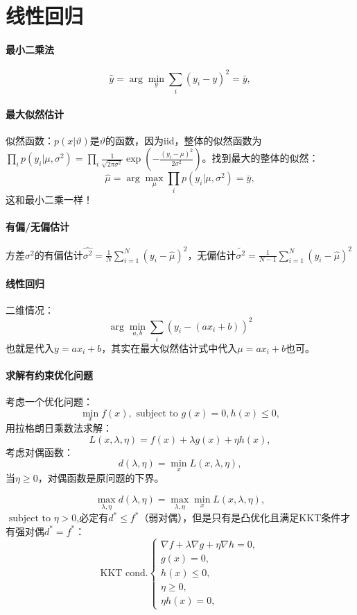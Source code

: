 \section{线性回归}

\paragraph{最小二乘法}
\begin{equation}
    \hat{y} = \arg \min_y \sum_i (y_i - y)^2 = \bar{y},
\end{equation}

\paragraph{最大似然估计} 似然函数：$p(x|\vartheta)$是$\vartheta$的函数，因为iid，整体的似然函数为$\prod_i p(y_i|\mu, \sigma^2) = \prod_i \frac{1}{\sqrt{2\pi\sigma^2}}\exp\left(-\frac{(y_i-\mu)^2}{2\sigma^2}\right)$。找到最大的整体的似然：
$$\hat{\mu} = \arg\max_\mu\prod_i p(y_i|\mu, \sigma^2) = \bar{y},$$这和最小二乘一样！

\paragraph{有偏/无偏估计} 方差$\sigma^2$的有偏估计$\hat{\sigma^2}=\frac{1}{N}\sum_{i=1}^N(y_i-\hat{\mu})^2$，无偏估计$\tilde{\sigma^2}=\frac{1}{N-1}\sum_{i=1}^N(y_i-\hat{\mu})^2$

\paragraph{线性回归}
二维情况：$$\arg\min_{a,b}\sum_i(y_i-(ax_i + b))^2$$
也就是代入$y=ax_i + b$，其实在最大似然估计式中代入$\mu=ax_i + b$也可。

\paragraph{求解有约束优化问题} 考虑一个优化问题：
$$\min_x f(x),\text{ subject to }g(x) = 0, h(x) \le 0,$$
用拉格朗日乘数法求解：
$$L(x,\lambda,\eta)=f(x)+\lambda g(x)+\eta h(x),$$
考虑对偶函数：
$$d(\lambda,\eta)=\min_xL(x,\lambda,\eta),$$
当$\eta \ge 0$，对偶函数是原问题的下界。

$$\max_{\lambda,\eta} d(\lambda,\eta)=\max_{\lambda,\eta}\min_xL(x,\lambda,\eta),$$
$\text{ subject to }\eta>0$,必定有$d^*\le f^*$（弱对偶），但是只有是凸优化且满足KKT条件才有强对偶$d^* = f^*$：
$$\text{KKT cond.} \left\{\begin{array}{l}
\nabla f + \lambda\nabla g + \eta\nabla h = 0, \\
g(x) = 0, \\
h(x) \le 0, \\
\eta \ge 0, \\
\eta h(x) = 0,
\end{array} \right.$$

